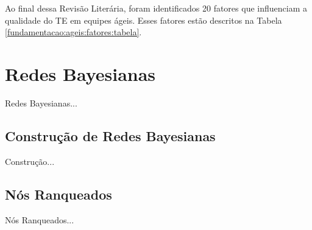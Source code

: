 Ao final dessa Revisão Literária, foram identificados 20 fatores que influenciam a qualidade do TE em equipes ágeis. Esses fatores estão descritos na Tabela \ref{fundamentacao:ageis:fatores:tabela}.

\section{Redes Bayesianas}
\label{fundamentacao:redes}

{\color{red} Redes Bayesianas...}

\subsection{Construção de Redes Bayesianas}
\label{fundamentacao:redes:construcao}

{\color{red} Construção...}

\subsection{Nós Ranqueados}
\label{fundamentacao:nos}

{\color{red} Nós Ranqueados...}
